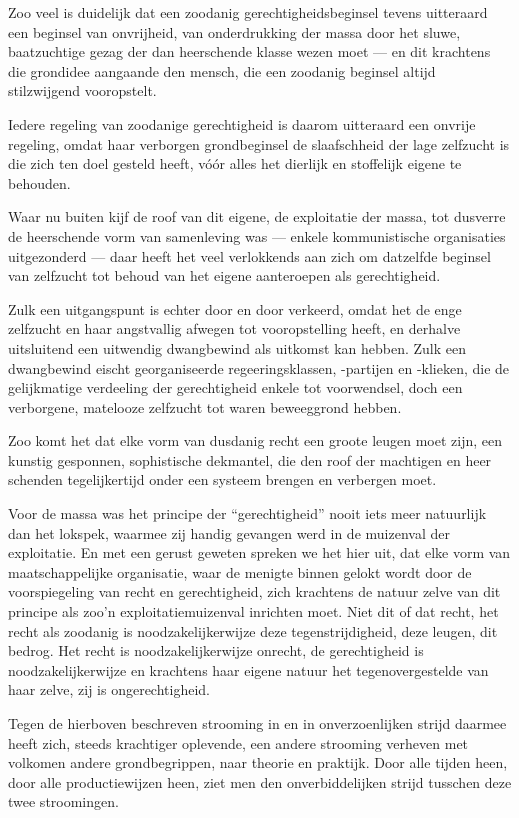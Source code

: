 \documentclass[a4paper, 12pt, oneside, dutch]{article}
\begin{document}
Zoo veel is duidelijk dat een zoodanig gerechtigheidsbeginsel tevens uitteraard een beginsel van onvrijheid, van onderdrukking der massa door het sluwe, baatzuchtige gezag der dan heerschende klasse wezen moet --- en dit krachtens die grondidee aangaande den mensch, die een zoodanig beginsel altijd stilzwijgend vooropstelt.

Iedere regeling van zoodanige gerechtigheid is daarom uitteraard een onvrije regeling, omdat haar verborgen grondbeginsel de slaafschheid der lage zelfzucht is die zich ten doel gesteld heeft, vóór alles het dierlijk en stoffelijk eigene te behouden.

Waar nu buiten kijf de roof van dit eigene, de exploitatie der massa, tot dusverre de heerschende vorm van samenleving was --- enkele kommunistische organisaties uitgezonderd --- daar heeft het veel verlokkends aan zich om datzelfde beginsel van zelfzucht tot behoud van het eigene aanteroepen als gerechtigheid.

Zulk een uitgangspunt is echter door en door verkeerd, omdat het de enge zelfzucht en haar angstvallig afwegen tot vooropstelling heeft, en derhalve uitsluitend een uitwendig dwangbewind als uitkomst kan hebben. Zulk een dwangbewind eischt georganiseerde regeeringsklassen, -partijen en -klieken, die de gelijkmatige verdeeling der gerechtigheid enkele tot voorwendsel, doch een verborgene, matelooze zelfzucht tot waren beweeggrond hebben.

Zoo komt het dat elke vorm van dusdanig recht een groote leugen moet zijn, een kunstig gesponnen, sophistische dekmantel, die den roof der machtigen en heer schenden tegelijkertijd onder een systeem brengen en verbergen moet.

Voor de massa was het principe der "`gerechtigheid"' nooit iets meer natuurlijk dan het lokspek, waarmee zij handig gevangen werd in de muizenval der exploitatie. En met een gerust geweten spreken we het hier uit, dat elke vorm van maatschappelijke organisatie, waar de menigte binnen gelokt wordt door de voorspiegeling van recht en gerechtigheid, zich krachtens de natuur zelve van dit principe als zoo'n exploitatiemuizenval inrichten moet. Niet dit of dat recht, het recht als zoodanig is noodzakelijkerwijze deze tegenstrijdigheid, deze leugen, dit bedrog. Het recht is noodzakelijkerwijze onrecht, de gerechtigheid is noodzakelijkerwijze en krachtens haar eigene natuur het tegenovergestelde van haar zelve, zij is ongerechtigheid.

Tegen de hierboven beschreven strooming in en in onverzoenlijken strijd daarmee heeft zich, steeds krachtiger oplevende, een andere strooming verheven met volkomen andere grondbegrippen, naar theorie en praktijk. Door alle tijden heen, door alle productiewijzen heen, ziet men den onverbiddelijken strijd tusschen deze twee stroomingen.
\end{document}
